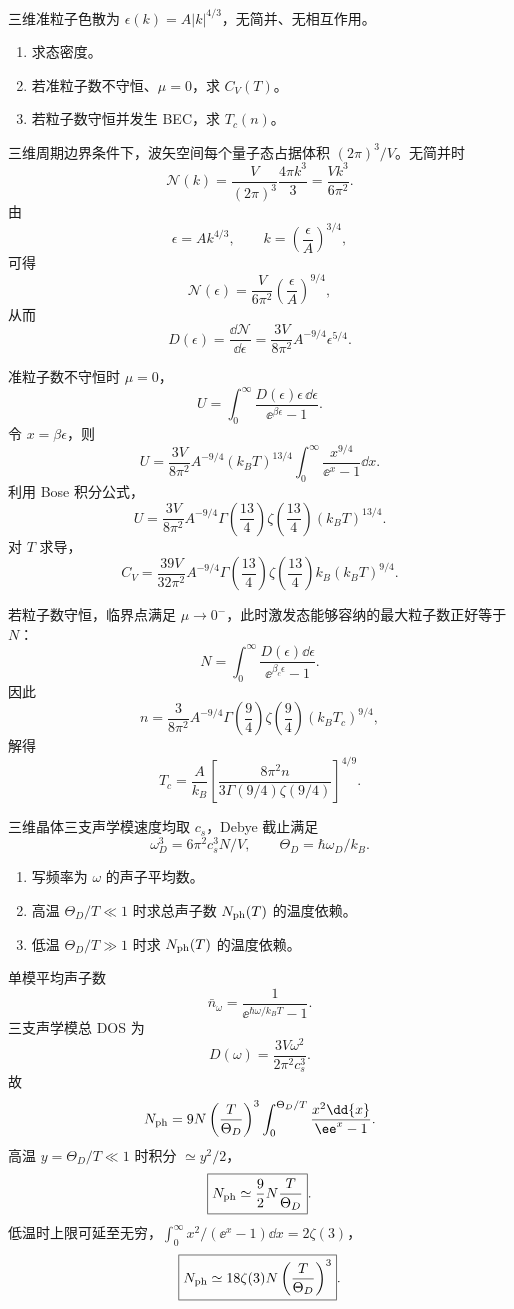 \begin{question}[15 分]
三维准粒子色散为 $\epsilon(k)=A|k|^{4/3}$，无简并、无相互作用。
\begin{enumerate}
\item 求态密度。
\item 若准粒子数不守恒、$\mu=0$，求 $C_V(T)$。
\item 若粒子数守恒并发生 BEC，求 $T_c(n)$。
\end{enumerate}
\begin{solution}
三维周期边界条件下，波矢空间每个量子态占据体积 $(2\pi)^3/V$。无简并时
\[
\mathcal N(k)=\frac{V}{(2\pi)^3}\frac{4\pi k^3}{3}=\frac{Vk^3}{6\pi^2}.
\]
由
\[
\epsilon=Ak^{4/3},\qquad k=\left(\frac{\epsilon}{A}\right)^{3/4},
\]
可得
\[
\mathcal N(\epsilon)=\frac{V}{6\pi^2}\left(\frac{\epsilon}{A}\right)^{9/4},
\]
从而
\[
\boxed{D(\epsilon)=\frac{\dd{\mathcal N}}{\dd{\epsilon}}
=\frac{3V}{8\pi^2}A^{-9/4}\epsilon^{5/4}}.
\]

准粒子数不守恒时 $\mu=0$，
\[
U=\int_0^\infty\frac{D(\epsilon)\epsilon\,\dd{\epsilon}}
{\ee^{\beta\epsilon}-1}.
\]
令 $x=\beta\epsilon$，则
\[
U=\frac{3V}{8\pi^2}A^{-9/4}(k_BT)^{13/4}
\int_0^\infty\frac{x^{9/4}}{\ee^x-1}\dd{x}.
\]
利用 Bose 积分公式，
\[
U=\frac{3V}{8\pi^2}A^{-9/4}
\Gamma\!\left(\frac{13}{4}\right)
\zeta\!\left(\frac{13}{4}\right)(k_BT)^{13/4}.
\]
对 $T$ 求导，
\[
\boxed{C_V=\frac{39V}{32\pi^2}A^{-9/4}
\Gamma\!\left(\frac{13}{4}\right)
\zeta\!\left(\frac{13}{4}\right)k_B(k_BT)^{9/4}}.
\]

若粒子数守恒，临界点满足 $\mu\to0^-$，此时激发态能够容纳的最大粒子数正好等于 $N$：
\[
N=\int_0^\infty\frac{D(\epsilon)\dd{\epsilon}}
{\ee^{\beta_c\epsilon}-1}.
\]
因此
\[
n=\frac{3}{8\pi^2}A^{-9/4}
\Gamma\!\left(\frac94\right)\zeta\!\left(\frac94\right)(k_BT_c)^{9/4},
\]
解得
\[
\boxed{T_c=\frac{A}{k_B}
\left[\frac{8\pi^2n}{3\Gamma(9/4)\zeta(9/4)}\right]^{4/9}}.
\]
\end{solution}
\end{question}

\begin{question}[15 分]
三维晶体三支声学模速度均取 $c_s$，Debye 截止满足
\[\omega_D^3=6\pi^2c_s^3N/V,\qquad \Theta_D=\hbar\omega_D/k_B.\]
\begin{enumerate}
\item 写频率为 $\omega$ 的声子平均数。
\item 高温 $\Theta_D/T\ll1$ 时求总声子数 $N_{\rm ph}(T)$ 的温度依赖。
\item 低温 $\Theta_D/T\gg1$ 时求 $N_{\rm ph}(T)$ 的温度依赖。
\end{enumerate}
\begin{solution}
单模平均声子数
\[\boxed{\bar n_\omega=\frac1{\ee^{\hbar\omega/k_BT}-1}}.\]
三支声学模总 DOS 为
\[D(\omega)=\frac{3V\omega^2}{2\pi^2c_s^3}.\]
故
\[N_{\rm ph}=9N\left(\frac{T}{\Theta_D}\right)^3\int_0^{\Theta_D/T}\frac{x^2\dd{x}}{\ee^x-1}.\]
高温 $y=\Theta_D/T\ll1$ 时积分 $\simeq y^2/2$，
\[\boxed{N_{\rm ph}\simeq\frac92N\frac{T}{\Theta_D}}.\]
低温时上限可延至无穷，$\int_0^\infty x^2/(\ee^x-1)\dd{x}=2\zeta(3)$，
\[\boxed{N_{\rm ph}\simeq18\zeta(3)N\left(\frac{T}{\Theta_D}\right)^3}.\]
\end{solution}
\end{question}

